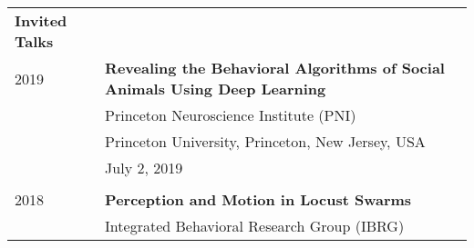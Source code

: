 \documentclass[letterpaper,6pt,oneside]{article}
\begin{document}
\begin{small}
\begin{longtable}{@{} l p{5.3in}l}
 \Large{\textbf{Invited Talks}}  \vspace{5mm} \\
 \large{2019}
 & \textbf{Revealing the Behavioral Algorithms of Social Animals Using Deep Learning} \\
 & Princeton Neuroscience Institute (PNI) \\
 & Princeton University, Princeton, New Jersey, USA \\
 & July 2, 2019 \\
 & \\
\large{2018}
& \textbf{Perception and Motion in Locust Swarms} \\
& Integrated Behavioral Research Group (IBRG) \\

\end{longtable}
\end{small}
\end{document}
